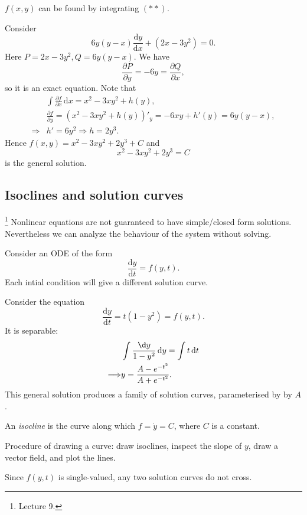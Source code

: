 \documentclass[a4paper]{article}
\begin{document}
    $f(x,y)$ can be found by integrating $(**)$.
    \begin{example}
        Consider 
        \[
            6y(y-x)\frac{\mathrm{d}y}{\mathrm{d}x}+(2x-3y^2)=0 
        .\]
        Here $P=2x-3y^2, Q=6y(y-x)$. We have 
        \[
            \frac{\partial P}{\partial y}=-6y= \frac{\partial Q}{\partial x}
        ,\]
        so it is an exact equation.
        Note that 
        \[
            \begin{aligned}
                 &\int \frac{\partial f}{\partial x}  \,\mathrm{d}x=x^2-3xy^2+h(y),\\
                 &\frac{\partial f}{\partial y}=(x^2-3xy^2+h(y))'_y= -6xy+h'(y)=6y(y-x),\\
                 \Longrightarrow & h'=6y^2 \Longrightarrow h=2y^3.
            \end{aligned}
        \]
        Hence $f(x,y)=x^2-3xy^2+2y^3+C$ and 
        \[
            x^2-3xy^2+2y^3=C
        \]
        is the general solution. 
    \end{example}
    \subsection{Isoclines and solution curves}\footnote{Lecture 9.}
    Nonlinear equations are not guaranteed to have simple/closed form solutions. Nevertheless we can analyze the behaviour of the system without solving.

    Consider an ODE of the form 
    \[
        \frac{\mathrm{d}y}{\mathrm{d}t}=f(y,t) 
    .\]
    Each intial condition will give a different solution curve.
    \begin{example}
        Consider the equation 
        \[
            \frac{\mathrm{d}y}{\mathrm{d}t}=t(1-y^2)=f(y,t) \tag{$*$}
        .\]
        It is separable:
        \[
            \begin{aligned}
                 &\int \frac{\d y}{1-y^2} \,\mathrm{d}y=\int t \,\mathrm{d}t\\
                 \Longrightarrow &y= \frac{A-e^{-t^2}}{A+e^{-t^2}}.
            \end{aligned}
        \]
        This general solution produces a family of solution curves, parameterised by by $A$.
    \end{example}
    \begin{definition}[Isocline]
        An \textit{isocline} is the curve along which $ f=\dot{y}=C $, where $C$ is a constant.
    \end{definition}
    Procedure of drawing a curve: draw isoclines, inspect the slope of $y$, draw a vector field, and plot the lines.
    \begin{remark}
        Since $f(y,t)$ is single-valued, any two solution curves do not cross.
    \end{remark}
\end{document}
